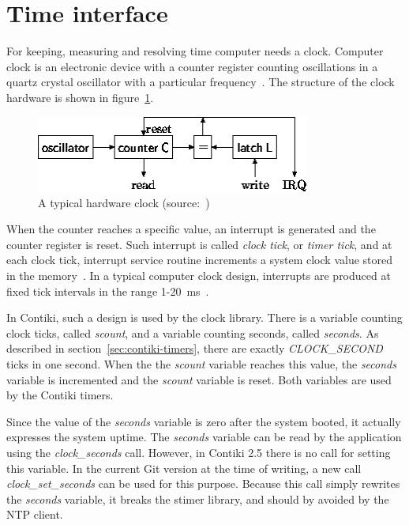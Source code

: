 
\section{Time interface}\label{sec:analysis-time}
For keeping, measuring and resolving time computer needs a clock.
Computer clock is an electronic device with a counter register counting oscillations in a
quartz crystal oscillator with a particular frequency~\cite{thesis-sync}.
The structure of the clock hardware is shown in figure~\ref{fig:system-hardware-clock}.
\begin{figure}
  \centering
  \includegraphics[width=9cm,keepaspectratio]{fig/pc-clock.png}
  \caption{A typical hardware clock (source:~\cite{thesis-beat})}
  \label{fig:system-hardware-clock}
\end{figure}
When the counter reaches a specific value, an interrupt is generated and the counter register is reset.
Such interrupt is called {\it{clock tick}}, or {\it{timer tick}}, and at each clock tick,
interrupt service routine increments a system clock value stored in the memory~\cite{thesis-sync}.
In a typical computer clock design, interrupts are produced at
fixed tick intervals in the range 1-20~ms~\cite{nanokernel}.

In Contiki, such a design is used by the clock library.
There is a variable counting clock ticks, called {\it{scount}},
and a variable counting seconds, called {\it{seconds}}.
As described in section~\ref{sec:contiki-timers}, there are
exactly {\it{CLOCK\_SECOND}} ticks in one second.
When the the {\it{scount}} variable reaches this value,
the {\it{seconds}} variable is incremented and the {\it{scount}} variable is reset.
Both variables are used by the Contiki timers.

Since the value of the {\it{seconds}} variable is zero after the system booted,
it actually expresses the system uptime.
The {\it{seconds}} variable can be read by the application using the {\it{clock\_seconds}} call.
However, in Contiki 2.5 there is no call for setting this variable.
In the current Git version at the time of writing, a new call {\it{clock\_set\_seconds}}
can be used for this purpose.
Because this call simply rewrites the {\it{seconds}} variable, it breaks the stimer library,
and should by avoided by the NTP client.

